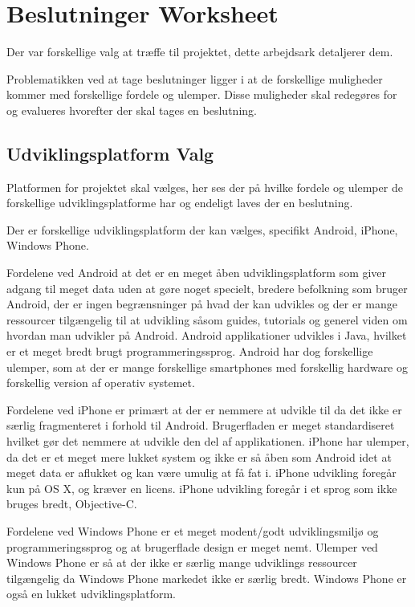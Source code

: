 \chapter{Beslutninger Worksheet}
Der var forskellige valg at træffe til projektet, dette arbejdsark detaljerer dem.
 
Problematikken ved at tage beslutninger ligger i at de forskellige muligheder kommer med forskellige fordele og ulemper.
Disse muligheder skal redegøres for og evalueres hvorefter der skal tages en beslutning.

\section{Udviklingsplatform Valg}
Platformen for projektet skal vælges, her ses der på hvilke fordele og ulemper de forskellige udviklingsplatforme har og endeligt laves der en beslutning.

Der er forskellige udviklingsplatform der kan vælges, specifikt Android, iPhone, Windows Phone. 

Fordelene ved Android at det er en meget åben udviklingsplatform som giver adgang til meget data uden at gøre noget specielt, bredere befolkning som bruger Android, der er ingen begrænsninger på hvad der kan udvikles og der er mange ressourcer tilgængelig til at udvikling såsom guides, tutorials og generel viden om hvordan man udvikler på Android. Android applikationer udvikles i Java, hvilket er et meget bredt brugt programmeringssprog.
Android har dog forskellige ulemper, som at der er mange forskellige smartphones med forskellig hardware og forskellig version af operativ systemet. 

Fordelene ved iPhone er primært at der er nemmere at udvikle til da det ikke er særlig fragmenteret i forhold til Android. Brugerfladen er meget standardiseret hvilket gør det nemmere at udvikle den del af applikationen. 
iPhone har ulemper, da det er et meget mere lukket system og ikke er så åben som Android idet at meget data er aflukket og kan være umulig at få fat i. iPhone udvikling foregår kun på OS X, og kræver en licens. iPhone udvikling foregår i et sprog som ikke bruges bredt, Objective-C.

Fordelene ved Windows Phone er et meget modent/godt udviklingsmiljø og programmeringssprog og at brugerflade design er meget nemt. 
Ulemper ved Windows Phone er så at der ikke er særlig mange udviklings ressourcer tilgængelig da Windows Phone markedet ikke er særlig bredt. Windows Phone er også en lukket udviklingsplatform.

